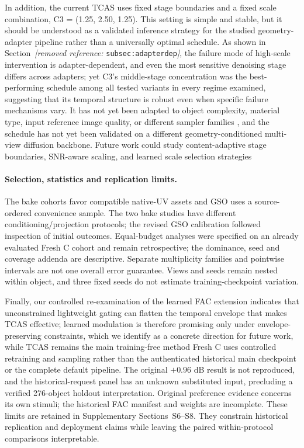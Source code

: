 \documentclass[times,twocolumn,final]{elsarticle}
\providecommand{\DIFadd}[1]{{\protect\color{blue} \sf #1}} %
\providecommand{\DIFdel}[1]{{\protect\color{red} \scriptsize #1}} %
\providecommand{\DIFaddbegin}{} %
\providecommand{\DIFaddend}{} %
\providecommand{\DIFdelbegin}{} %
\providecommand{\DIFdelend}{} %
\begin{document}
\DIFdelbegin \DIFdel{In addition, the current TCAS uses fixed stage boundaries and a fixed scale combination, C3 = (1.25, 2.50, 1.25). This setting is simple and stable, but it should be understood as a validated inference strategy for the studied geometry-adapter pipeline rather than a universally optimal schedule.
As shown in Section~\textit{[removed reference: }\texttt{subsec:adapterdep}\textit{]}, the failure mode of high-scale intervention is adapter-dependent, and even the most sensitive denoising stage differs across adapters; yet C3's middle-stage concentration was the best-performing schedule among all tested variants in every regime examined, suggesting that its temporal structure is robust even when specific failure mechanisms vary. It has not yet been adapted to object complexity, material type, input reference image quality, or different sampler families , and the schedule has not yet been validated on a different geometry-conditioned multi-view diffusion backbone. Future work could study content-adaptive stage boundaries, SNR-aware scaling, and learned scale selection strategies}\DIFdelend \DIFaddbegin \paragraph{Selection, statistics and replication limits.}
\DIFadd{The bake cohorts favor compatible native-UV assets and GSO uses a source-ordered convenience sample. The two bake studies have different conditioning/projection protocols; the revised GSO calibration followed inspection of initial outcomes. Equal-budget analyses were specified on an already evaluated Fresh C cohort and remain retrospective; the dominance, seed and coverage addenda are descriptive. Separate multiplicity families and pointwise intervals are not one overall error guarantee. Views and seeds remain nested within object, and three fixed seeds do not estimate training-checkpoint variation}\DIFaddend .

\DIFdelbegin \DIFdel{Finally, our controlled re-examination of the learned FAC extension indicates that unconstrained lightweight gating can flatten the temporal envelope that makes TCAS effective; learned modulation is therefore promising only under envelope-preserving constraints, which we identify as a concrete direction for future work, while TCAS remains the main training-free method}\DIFdelend \DIFaddbegin \DIFadd{Fresh C uses controlled retraining and sampling rather than the authenticated historical main checkpoint or the complete default pipeline. The original $+0.96$ dB result is not reproduced, and the historical-request panel has an unknown substituted input, precluding a verified 276-object holdout interpretation. Original preference evidence concerns its own stimuli; the historical FAC manifest and weights are incomplete. These limits are retained in Supplementary Sections~S6--S8. They constrain historical replication and deployment claims while leaving the paired within-protocol comparisons interpretable}\DIFaddend .
\end{document}
